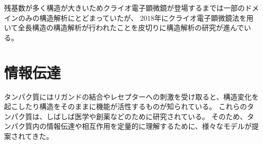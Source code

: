 残基数が多く構造が大きいためクライオ電子顕微鏡が登場するまでは一部のドメインのみの構造解析にとどまっていたが、
2018年にクライオ電子顕微鏡法を用いて全長構造の構造解析が行われた\autocite{singhStructureGatingMechanism2018,zubcevic_conformational_2018}ことを皮切りに構造解析の研究が進んでいる。


\section{情報伝達}\label{sec:information_transmission}
タンパク質にはリガンドの結合やレセプターへの刺激を受け取ると、構造変化を起こしたり構造をそのままに機能が活性するものが知られている。
これらのタンパク質は、しばしば医学や創薬などのために研究されている。
そのため、タンパク質内の情報伝達や相互作用を定量的に理解するために、様々なモデルが提案されてきた。%

